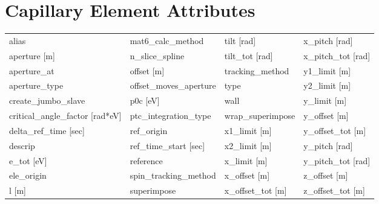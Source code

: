  \begin{tabular}{llll} \toprule
 \bottomrule
 \end{tabular}
 \vfill
 
 \section{Capillary Element Attributes}
 \label{s:list.capillary}
 
 \begin{tabular}{llll} \toprule
alias                            & mat6_calc_method                 & tilt [rad]                       & x_pitch [rad]                    \\
aperture [m]                     & n_slice_spline                   & tilt_tot [rad]                   & x_pitch_tot [rad]                \\
aperture_at                      & offset [m]                       & tracking_method                  & y1_limit [m]                     \\
aperture_type                    & offset_moves_aperture            & type                             & y2_limit [m]                     \\
create_jumbo_slave               & p0c [eV]                         & wall                             & y_limit [m]                      \\
critical_angle_factor [rad*eV]   & ptc_integration_type             & wrap_superimpose                 & y_offset [m]                     \\
delta_ref_time [sec]             & ref_origin                       & x1_limit [m]                     & y_offset_tot [m]                 \\
descrip                          & ref_time_start [sec]             & x2_limit [m]                     & y_pitch [rad]                    \\
e_tot [eV]                       & reference                        & x_limit [m]                      & y_pitch_tot [rad]                \\
ele_origin                       & spin_tracking_method             & x_offset [m]                     & z_offset [m]                     \\
l [m]                            & superimpose                      & x_offset_tot [m]                 & z_offset_tot [m]                 \\
 \bottomrule
 \end{tabular}
 \vfill
 
